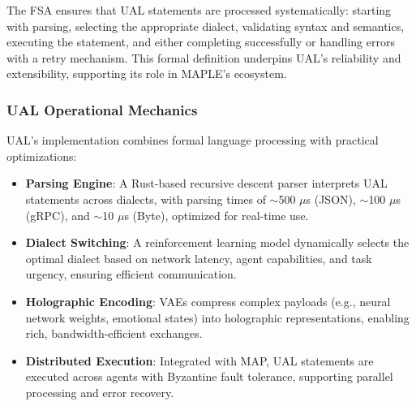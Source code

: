 \documentclass[a4paper,11pt]{article}
\begin{document}
The FSA ensures that UAL statements are processed systematically: starting with parsing, selecting the appropriate dialect, validating syntax and semantics, executing the statement, and either completing successfully or handling errors with a retry mechanism. This formal definition underpins UAL’s reliability and extensibility, supporting its role in MAPLE’s ecosystem.

\subsubsection{UAL Operational Mechanics}
UAL’s implementation combines formal language processing with practical optimizations:
\begin{itemize}[leftmargin=*]
    \item \textbf{Parsing Engine}: A Rust-based recursive descent parser interprets UAL statements across dialects, with parsing times of $\sim$500 $\mu$s (JSON), $\sim$100 $\mu$s (gRPC), and $\sim$10 $\mu$s (Byte), optimized for real-time use.
    \item \textbf{Dialect Switching}: A reinforcement learning model dynamically selects the optimal dialect based on network latency, agent capabilities, and task urgency, ensuring efficient communication.
    \item \textbf{Holographic Encoding}: VAEs compress complex payloads (e.g., neural network weights, emotional states) into holographic representations, enabling rich, bandwidth-efficient exchanges.
    \item \textbf{Distributed Execution}: Integrated with MAP, UAL statements are executed across agents with Byzantine fault tolerance, supporting parallel processing and error recovery.
\end{itemize}
\end{document}
